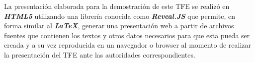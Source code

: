 La presentaci\'on elaborada para la demostraci\'on de este \ac{TFE} se realiz\'o en \textbf{\textit{HTML5}} utilizando una librer\'ia conocida como \textbf{\textit{Reveal.JS}} que permite, en forma similar al \textbf{\textit{LaTeX}}, generar una presentaci\'on web a partir de archivos fuentes que contienen los textos y otros datos necesarios para que esta pueda ser creada y a su vez reproducida en un navegador o browser al momento de realizar la presentaci\'on del \ac{TFE} ante las autoridades correspondientes.


